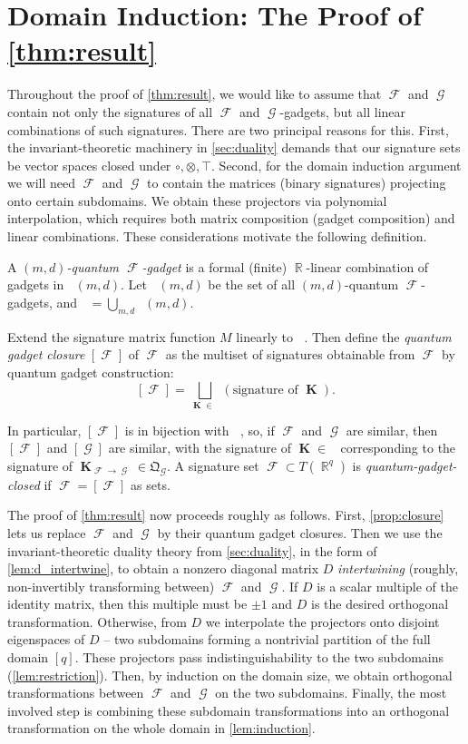 \documentclass{theoretics}
\DeclareMathOperator{\rr}{\mathbb{R}}
\DeclareMathOperator{\vk}{\mathbf{K}}
\DeclareMathOperator{\fc}{\mathcal{F}}
\DeclareMathOperator{\gc}{\mathcal{G}}
\DeclareMathOperator{\gk}{\mathfrak{G}_{\mathcal{F}}}
\DeclareMathOperator{\qk}{\mathfrak{Q}_{\mathcal{F}}}
\begin{document}
\section{Domain Induction: The Proof of \autoref{thm:result}}
\label{sec:proof}
Throughout the proof of \autoref{thm:result}, we would like to assume that $\fc$ and $\gc$
contain not only the signatures of all $\fc$ and $\gc$-gadgets, but all linear combinations
of such signatures. There are two principal reasons for this. First, the
invariant-theoretic machinery in \autoref{sec:duality} demands that our signature sets be
vector spaces closed under $\circ,\otimes,\top$. 
Second, for the domain induction argument we will need $\fc$ and $\gc$ to contain the
matrices (binary signatures) projecting onto certain subdomains. We obtain these projectors
via polynomial interpolation, which requires both matrix composition
(gadget composition) and linear combinations.
These considerations motivate the following definition.
\begin{definition}[$\qk(m,d), {[\fc]}$]
    \label{def:quantum_gadget}
    A \emph{$(m,d)$-quantum $\fc$-gadget} is a formal (finite) $\rr$-linear combination of gadgets in
    $\gk(m,d)$. Let $\qk(m,d)$ be the set of all $(m,d)$-quantum $\fc$-gadgets,
    and $\qk = \bigcup_{m,d}\qk(m,d)$.

    Extend the signature matrix function $M$ linearly to $\qk$. 
    Then define the \emph{quantum gadget closure} $[\fc]$ of $\fc$ as the
    multiset of signatures obtainable from $\fc$ by quantum gadget construction:
    \[
        [\fc] = \bigsqcup_{\vk \in \qk} (\text{signature of $\vk$}).
    \]
\end{definition}
In particular, $[\fc]$ is in bijection with $\qk$, so,
if $\fc$ and $\gc$ are similar, then $[\fc]$ and
$[\gc]$ are similar, with the signature of $\vk \in \qk$ corresponding to the signature of
$\vk_{\fc\to\gc} \in \mathfrak{Q}_{\gc}$.
A signature set $\fc \subset T(\rr^q)$ is \emph{quantum-gadget-closed} if $\fc = [\fc]$ as
sets.

The proof of \autoref{thm:result} now proceeds roughly as follows. First, \autoref{prop:closure}
lets us replace $\fc$ and $\gc$ by their quantum gadget closures. Then we use the
invariant-theoretic duality theory from \autoref{sec:duality}, in the form of
\autoref{lem:d_intertwine}, to obtain a nonzero diagonal matrix $D$ \emph{intertwining}
(roughly, non-invertibly transforming between) $\fc$ and $\gc$. If $D$ is a scalar multiple
of the identity matrix, then this multiple must be $\pm 1$ and $D$ is the desired
orthogonal transformation. Otherwise, from $D$ we
interpolate the projectors onto disjoint eigenspaces of $D$ -- two subdomains forming a 
nontrivial partition of the full domain $[q]$. 
These projectors pass indistinguishability to the two subdomains (\autoref{lem:restriction}).
Then, by induction on the domain size, we obtain orthogonal transformations between $\fc$
and $\gc$ on the two subdomains. Finally, the most involved step is combining these
subdomain transformations into
an orthogonal transformation on the whole domain in \autoref{lem:induction}.
\end{document}
